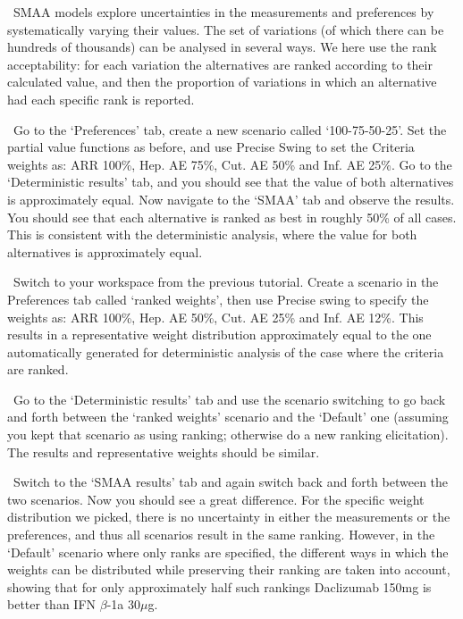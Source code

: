 \documentclass[00_mcda_tutorial.tex]{subfiles}
\begin{document}
\noindent \faGraduationCap \, SMAA models explore uncertainties in the measurements and preferences by systematically varying their values\footnotemark. The set of variations (of which there can be hundreds of thousands) can be analysed in several ways. We here use the rank acceptability: for each variation the alternatives are ranked according to their calculated value, and then the proportion of variations in which an alternative had each specific rank is reported.
\newline

\noindent \leftpointright \, Go to the ‘Preferences’ tab, create a new scenario called ‘100-75-50-25’. Set the partial value functions as before, and use Precise Swing to set the Criteria weights as:  ARR 100\%, Hep. AE 75\%, Cut. AE 50\% and Inf. AE 25\%. Go to the ‘Deterministic results’ tab, and you should see that the value of both alternatives is approximately equal. Now navigate to the ‘SMAA’ tab and observe the results. You should see that each alternative is ranked as best in roughly 50\% of all cases. This is consistent with the deterministic analysis, where the value for both alternatives is approximately equal.
\newline

\noindent \leftpointright \, Switch to your workspace from the previous tutorial. Create a scenario in the Preferences tab called ‘ranked weights’, then use Precise swing to specify the weights as:  ARR 100\%, Hep. AE 50\%, Cut. AE 25\% and Inf. AE 12\%. This results in a representative weight distribution approximately equal to the one automatically generated for deterministic analysis of the case where the criteria are ranked.
\newline

\noindent \leftpointright \, Go to the ‘Deterministic results’ tab and use the scenario switching to go back and forth between the ‘ranked weights’ scenario and the ‘Default’ one (assuming you kept that scenario as using ranking; otherwise do a new ranking elicitation). The results and representative weights should be similar.
\newline

\noindent \leftpointright \, Switch to the ‘SMAA results’ tab and again switch back and forth between the two scenarios. Now you should see a great difference. For the specific weight distribution we picked, there is no uncertainty in either the measurements or the preferences, and thus all scenarios result in the same ranking. However, in the ‘Default’ scenario where only ranks are specified, the different ways in which the weights can be distributed while preserving their ranking are taken into account, showing that for only approximately half such rankings Daclizumab 150mg is better than IFN $\beta$-1a 30$\mu$g.
\newline
\end{document}
